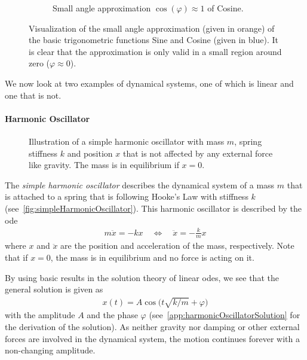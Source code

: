 \begin{figure}
\begin{subfigure}[t]{0.5\linewidth}
			\caption{Small angle approximation \( \cos(\varphi) \approx 1 \) of Cosine.}
		\end{subfigure}
		\caption{Visualization of the small angle approximation (given in orange) of the basic trigonometric functions Sine and Cosine (given in blue). It is clear that the approximation is only valid in a small region around zero (\( \varphi \approx 0 \)).}
		\label{fig:smallAngleApproximation}
	\end{figure}

	We now look at two examples of dynamical systems, one of which is linear and one that is not.

	\paragraph{Harmonic Oscillator}
		\label{subsec:harmonicOscillator}

		\begin{figure}
			\centering
			\tikzHarmonicOscillator
			\caption{Illustration of a simple harmonic oscillator with mass \(m\), spring stiffness \(k\) and position \(x\) that is not affected by any external force like gravity. The mass is in equilibrium if \( x = 0 \).}
			\label{fig:simpleHarmonicOscillator}
		\end{figure}

		The \emph{simple harmonic oscillator} describes the dynamical system of a mass \(m\) that is attached to a spring that is following Hooke's Law with stiffness \(k\) (see~\autoref{fig:simpleHarmonicOscillator}). This harmonic oscillator is described by the \ac{ode}
		\begin{align}
			m\ddot{x} = -kx \quad\iff\quad \ddot{x} = -\frac{k}{m} x  \label{eq:harmonicOscillator}
		\end{align}
		where \(x\) and \(\ddot{x}\) are the position and acceleration of the mass, respectively. Note that if \( x = 0 \), the mass is in equilibrium and no force is acting on it.

		By using basic results in the solution theory of linear \acp{ode}, we see that the general solution is given as
		\begin{align*}
			x(t) = A \cos\Big(t \sqrt{k / m} + \varphi\Big)
		\end{align*}
		with the amplitude \(A\) and the phase \(\varphi\) (see~\autoref{app:harmonicOscillatorSolution} for the derivation of the solution). As neither gravity nor damping or other external forces are involved in the dynamical system, the motion continues forever with a non-changing amplitude.

